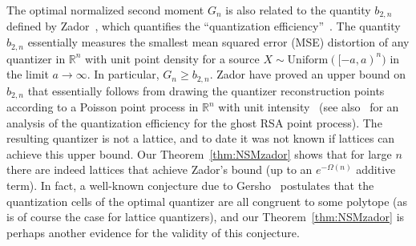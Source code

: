 \documentclass[article,doublecolumn]{IEEEtran}
\newcommand{\R}{{\mathbb{R}}}
\newcommand{\Unif}{\mathrm{Uniform}}
\begin{document}
The optimal normalized second moment $G_n$ is also related to the quantity $b_{2,n}$ defined by Zador~\cite{zador1982asymptotic}, which quantifies the ``quantization efficiency''~\cite{gersho79,ramibook}. The quantity $b_{2,n}$ essentially measures the smallest mean squared error (MSE) distortion of any quantizer in $\R^n$ with unit point density for a source $X\sim\Unif([-a,a)^n)$ in the limit $a\to\infty$. In particular, $G_n\geq b_{2,n}$. Zador have proved an upper bound on $b_{2,n}$ that essentially follows from drawing the quantizer reconstruction points according to a Poisson point process in $\R^n$ with unit intensity~\cite[Lemma 5]{zador1982asymptotic} (see also~\cite{torquato2010reformulation} for an analysis of the quantization efficiency for the ghost RSA point process). The resulting quantizer is not a lattice, and to date it was not known if lattices can achieve this upper bound. Our Theorem~\ref{thm:NSMzador} shows that for large $n$ there are indeed lattices that achieve Zador's bound (up to an $e^{-\Omega(n)}$ additive term). In fact, a well-known conjecture due to Gersho~\cite{gersho79} postulates that the quantization cells of the optimal quantizer are all congruent to some polytope (as is of course the case for lattice quantizers), and our Theorem~\ref{thm:NSMzador} is perhaps another evidence for the validity of this conjecture. 

\medskip
\end{document}
